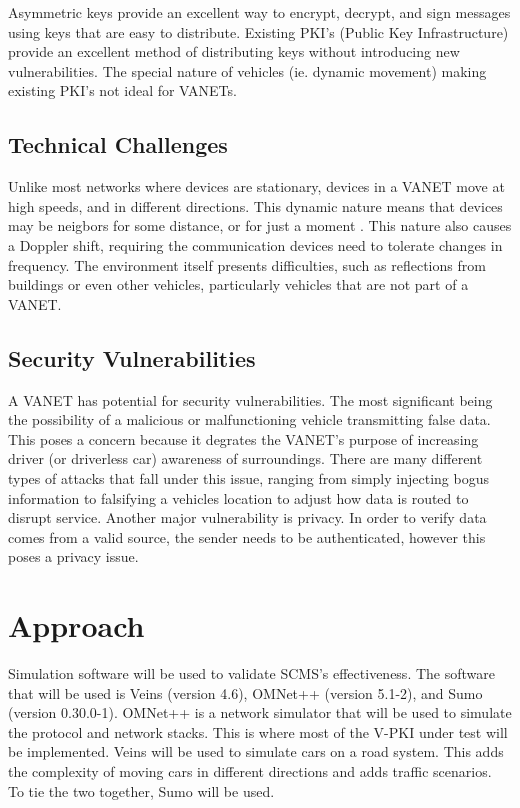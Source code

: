 \documentclass [11pt]{article}
\begin{document}
Asymmetric keys provide an excellent way to encrypt, decrypt, and sign messages using keys that are easy to distribute. Existing PKI's (Public Key Infrastructure) provide an excellent method of distributing keys without introducing new vulnerabilities. The special nature of vehicles (ie. dynamic movement) making existing PKI's not ideal for VANETs.

\subsection{Technical Challenges}
Unlike most networks where devices are stationary, devices in a VANET move at high speeds, and in different directions. This dynamic nature means that devices may be neigbors for some distance, or for just a moment \autocite{CommPatterns}. This nature also causes a Doppler shift, requiring the communication devices need to tolerate changes in frequency. The environment itself presents difficulties, such as reflections from buildings or even other vehicles, particularly vehicles that are not part of a VANET.

\subsection{Security Vulnerabilities}
A VANET has potential for security vulnerabilities. The most significant being the possibility of a malicious or malfunctioning vehicle transmitting false data. This poses a concern because it degrates the VANET's purpose of increasing driver (or driverless car) awareness of surroundings. There are many different types of attacks that fall under this issue, ranging from simply injecting bogus information to falsifying a vehicles location to adjust how data is routed to disrupt service. Another major vulnerability is privacy. In order to verify data comes from a valid source, the sender needs to be authenticated, however this poses a privacy issue.

\section{Approach}

Simulation software will be used to validate SCMS's effectiveness.
The software that will be used is Veins (version 4.6), OMNet++ (version 5.1-2), and Sumo (version 0.30.0-1). OMNet++ is a network simulator that will be used to simulate the protocol and network stacks. This is where most of the V-PKI under test will be implemented. Veins will be used to simulate cars on a road system. This adds the complexity of moving cars in different directions and adds traffic scenarios. To tie the two together, Sumo will be used.
\end{document}
